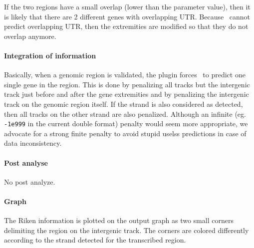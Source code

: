 \begin{itemize}
  If the two regions have a small overlap (lower than the parameter
  value), then it is likely that there are 2 different genes with
  overlapping UTR. Because \EuGene\ cannot predict overlapping UTR,
  then the extremities are modified so that they do not overlap
  anymore.
\end{itemize}

\paragraph{Integration of information}

Basically, when a genomic region is validated, the plugin forces
\EuGene\ to predict one single gene in the region. This is done by
penalizing all tracks but the intergenic track just before and after
the gene extremities and by penalizing the intergenic track on the
genomic region itself. If the strand is also considered as detected,
then all tracks on the other strand are also penalized.  Although an
infinite (eg. \texttt{-1e999} in the current double format) penalty
would seem more appropriate, we advocate for a strong finite penalty
to avoid stupid uselss predictions in case of data inconsistency.

\paragraph{Post analyse}

No post analyze.

\paragraph{Graph}

The Riken information is plotted on the output graph as two small
corners delimiting the region on the intergenic track. The corners are
colored differently according to the strand detected for the
transcribed region.





